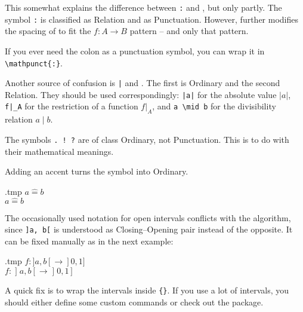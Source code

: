 \begin{gotcha}
This somewhat explains the difference between \verb|:| and , but only partly.
The symbol \verb|:| is classified as Relation and  as Punctuation.
However,  further modifies the spacing of 
to fit the $f \colon A \to B$ pattern -- and only that pattern.

If you ever need the colon as a punctuation symbol, you can wrap it in \verb|\mathpunct{:}|.
\end{gotcha}

\begin{gotcha}
Another source of confusion is \verb.|. and .
The first is Ordinary and the second Relation.
They should be used correspondingly:
\verb.|a|. for the absolute value $|a|$,
\verb.f|_A. for the restriction of a function $f|_A$,
and \verb.a \mid b. for the divisibility relation $a \mid b$.
\end{gotcha}

\begin{gotcha}
The symbols \verb|. ! ?| are of class Ordinary, not Punctuation.
This is to do with their mathematical meanings.
\end{gotcha}

\begin{gotcha}
Adding an accent turns the symbol into Ordinary.
%
\begin{VerbatimOut}{\jobname.tmp}
$a \hat= b$\\
$a \mathrel{\hat=} b$
\end{VerbatimOut}
\ShowExample
\end{gotcha}

\begin{gotcha}
The occasionally used notation for open intervals conflicts with the algorithm,
since \verb|]a, b[| is understood as Closing--Opening pair instead of the opposite.
It can be fixed manually as in the next example:
%
\begin{VerbatimOut}{\jobname.tmp}
$f \colon ]a, b[ \to ]0, 1]$\\
$f \colon \mathopen]a, b\mathclose[
    \to \mathopen]0, 1]$
\end{VerbatimOut}
\ShowExample
%
A quick fix is to wrap the intervals inside \verb|{}|.
If you use a lot of intervals,
you should either define some custom commands or check out the  package.
\end{gotcha}



